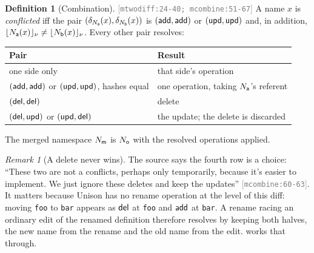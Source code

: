 \documentclass[11pt]{article}
\theoremstyle{definition}
\newtheorem{definition}{Definition}[section]
\theoremstyle{plain}
\theoremstyle{remark}
\newtheorem{remark}{Remark}[section]
\newcommand{\src}[1]{{\footnotesize\textcolor{gray}{[\texttt{#1}]}}}
\begin{document}
\begin{definition}[Combination]\label{def:mergecombine}
\src{mtwodiff:24-40; mcombine:51-67} A name $x$ is \emph{conflicted} iff the pair
$(\delta_{N_{\mathsf{a}}}(x), \delta_{N_{\mathsf{b}}}(x))$ is $(\mathsf{add},\mathsf{add})$ or $(\mathsf{upd},\mathsf{upd})$ and, in addition,
$\lfloor N_{\mathsf{a}}(x) \rfloor_{\nu} \neq \lfloor N_{\mathsf{b}}(x) \rfloor_{\nu}$. Every other pair resolves:
\begin{center}\small
\begin{tabular}{@{}ll@{}}
\toprule
Pair & Result \\
\midrule
one side only & that side's operation \\
$(\mathsf{add},\mathsf{add})$ or $(\mathsf{upd},\mathsf{upd})$, hashes equal & one operation, taking $N_{\mathsf{a}}$'s referent \\
$(\mathsf{del},\mathsf{del})$ & delete \\
$(\mathsf{del},\mathsf{upd})$ or $(\mathsf{upd},\mathsf{del})$ & the update; the delete is discarded \\
\bottomrule
\end{tabular}
\end{center}
The merged namespace $N_{\mathsf{m}}$ is $N_{\mathsf{o}}$ with the resolved operations applied.
\end{definition}

\begin{remark}[A delete never wins]\label{rem:updel}
The source says the fourth row is a choice: ``These two are not a conflicts, perhaps only temporarily,
because it's easier to implement. We just ignore these deletes and keep the updates''
\src{mcombine:60-63}. It matters because Unison has no rename operation at the level of this diff:
moving \texttt{foo} to \texttt{bar} appears as $\mathsf{del}$ at \texttt{foo} and $\mathsf{add}$ at \texttt{bar}.
A rename racing an ordinary edit of the renamed definition therefore resolves by keeping both halves,
the new name from the rename and the old name from the edit.  works that through.
\end{remark}
\end{document}
